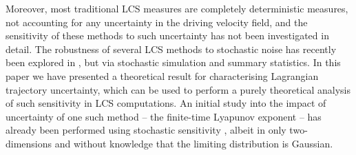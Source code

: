 Moreover, most traditional LCS measures are completely deterministic measures, not accounting for any uncertainty in the driving velocity field, and the sensitivity of these methods to such uncertainty has not been investigated in detail. 
The robustness of several LCS methods to stochastic noise has recently been explored in \cite{BadzaEtAl_2023_HowSensitiveAre}, but via stochastic simulation and summary statistics. 
In this paper we have presented a theoretical result for characterising Lagrangian trajectory uncertainty, which can be used to perform a purely theoretical analysis of such sensitivity in LCS computations.
An initial study into the impact of uncertainty of one such method -- the finite-time Lyapunov exponent -- has already been performed using stochastic sensitivity \cite{Balasuriya_2020_UncertaintyFinitetimeLyapunov}, albeit in only two-dimensions and without knowledge that the limiting distribution is Gaussian.

